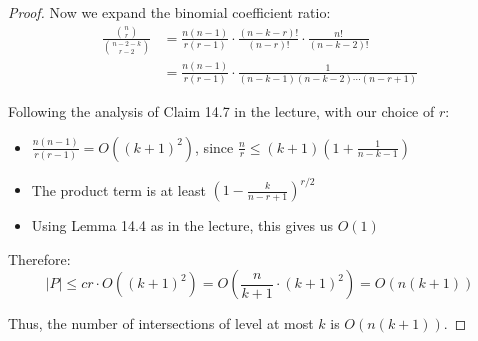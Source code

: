 \documentclass{article}
\begin{document}
\begin{proof}
Now we expand the binomial coefficient ratio:
\begin{align*}
\frac{\binom{n}{r}}{\binom{n-2-k}{r-2}} &= \frac{n(n-1)}{r(r-1)} \cdot \frac{(n-k-r)!}{(n-r)!} \cdot \frac{n!}{(n-k-2)!} \\
&= \frac{n(n-1)}{r(r-1)} \cdot \frac{1}{(n-k-1)(n-k-2)\cdots(n-r+1)}
\end{align*}

Following the analysis of Claim 14.7 in the lecture, with our choice of $r$:
\begin{itemize}
\item $\frac{n(n-1)}{r(r-1)} = O((k+1)^2)$, since $\frac{n}{r} \leq (k+1)(1 + \frac{1}{n-k-1})$
\item The product term is at least $(1 - \frac{k}{n-r+1})^{r/2}$
\item Using Lemma 14.4 as in the lecture, this gives us $O(1)$
\end{itemize}

Therefore:
\[|P| \leq cr \cdot O((k+1)^2) = O\left(\frac{n}{k+1} \cdot (k+1)^2\right) = O(n(k+1))\]

Thus, the number of intersections of level at most $k$ is $O(n(k+1))$.
\end{proof}
\end{document}
